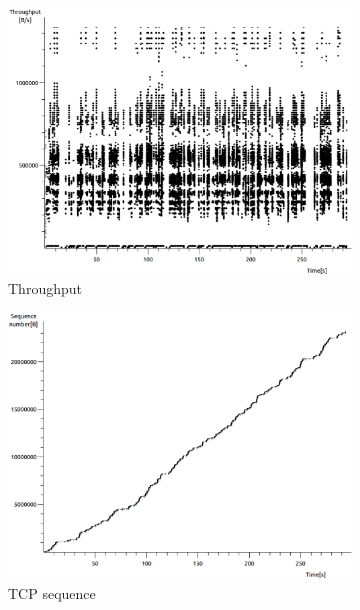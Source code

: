 \documentclass[conference,a4paper]{IEEEtran}
\begin{document}
\begin{figure}
 \centering
 \begin{subfigure}[b]{0.2\textwidth}
  \includegraphics[width=\textwidth]{s2-0_thru}
  \caption{Throughput}
 \end{subfigure}
 \begin{subfigure}[b]{0.2\textwidth}
  \includegraphics[width=\textwidth]{s2-0_seq}
  \caption{TCP sequence}
 \end{subfigure}
 \begin{subfigure}[b]{0.2\textwidth}

\end{subfigure}
\end{figure}
\end{document}
